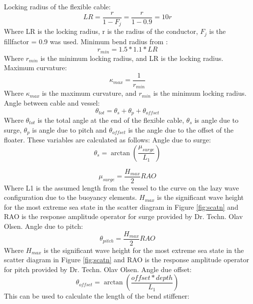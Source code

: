 \noindent Locking radius of the flexible cable:
\begin{equation}
    LR = \frac{r}{1-F_j} = \frac{r}{1-0.9} = 10r
\end{equation}
Where LR is the locking radius, r is the radius of the conductor, $F_j$ is the fillfactor = 0.9 was used. \newline
\newline
Minimum bend radius from \cite{API2014}:
\begin{equation}
   r_{min}= 1.5 * 1.1 * LR
\end{equation}
Where $r_{min}$ is the minimum locking radius, and LR is the locking radius. 
\newline
\newline
Maximum curvature:
\begin{equation}
   \kappa_{max}= \frac{1}{r_{min}}
\end{equation}
Where $\kappa_{max}$ is the maximum curvature, and  $r_{min}$ is the minimum locking radius.
\newline
\newline
Angle between cable and vessel: 
\begin{equation}
   \theta_{tot} = \theta_{s} + \theta_{p} +   \theta_{offset}
\end{equation}
Where $\theta_{tot}$ is the total angle at the end of the flexible cable, $\theta_{s}$ is angle due to surge, $\theta_{p}$ is angle due to pitch and $\theta_{offset}$ is the angle due to the offset of the floater. These variables are calculated as follows:\newline
\newline 
Angle due to surge:
\begin{equation}
   \theta_{s} = \arctan{(\frac{\mu_{surge}}{L_{1}})}
\end{equation}

\begin{equation}
   \mu_{surge} = \frac{H_{max}}{2} RAO
\end{equation}
Where L{1} is the assumed length from the vessel to the curve on the lazy wave configuration due to the buoyancy elements.  $H_{max}$ is the significant wave height for the most extreme sea state in the scatter diagram in Figure \ref{fig:scatn} and RAO is the response amplitude operator for surge provided by Dr. Techn. Olav Olsen. \newline
\newline 
\noindent Angle due to pitch:
\begin{equation}
   \theta_{pitch} = \frac{H_{max}}{2} RAO
\end{equation}
Where $H_{max}$ is the significant wave height for the most extreme sea state in the scatter diagram in Figure \ref{fig:scatn} and RAO is the response amplitude operator for pitch provided by Dr. Techn. Olav Olsen. \newline
\newline
Angle due offset:
\begin{equation}
   \theta_{offset} = \arctan{(\frac{offset * depth}{L_1})}
\end{equation}
This can be used to calculate the length of the bend stiffener:

